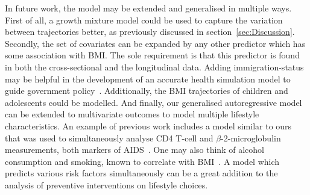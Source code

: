 \documentclass{imammb}
\numberwithin{equation}{section}
\begin{document}
In future work, the model may be extended and generalised in multiple ways. First of all, a growth mixture model could be used to capture the variation between trajectories better, as previously discussed in section~\ref{sec:Discussion}. Secondly, the set of covariates can be expanded by any other predictor which has some association with BMI. The sole requirement is that this predictor is found in both the cross-sectional and the longitudinal data. Adding immigration-status may be helpful in the development of an accurate health simulation model to guide government policy~\citep{TenDam2023}. Additionally, the BMI trajectories of children and adolescents could be modelled. And finally, our generalised autoregressive model can be extended to multivariate outcomes to model multiple lifestyle characteristics. An example of previous work includes a model similar to ours that was used to simultaneously analyse CD4 T-cell and $\beta$-2-microglobulin measurements, both markers of AIDS~\citep{Sy1997}. One may also think of alcohol consumption and smoking, known to correlate with BMI~\citep{Chiolero2008, Traversy2015}. A model which predicts various risk factors simultaneously can be a great addition to the analysis of preventive interventions on lifestyle choices.

\vspace*{6pt}

\nocite{*}


\end{document}
